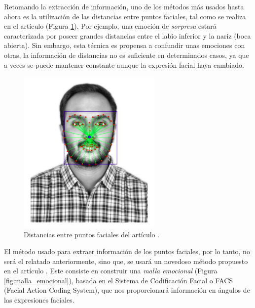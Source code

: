 Retomando la extracción de información, uno de los métodos más usados hasta ahora es la utilización de las distancias entre puntos faciales, tal como se realiza en el artículo \cite{dlib_emotions} (Figura \ref{fig:dlib_foto_articulo}). Por ejemplo, una emoción de \textit{sorpresa} estará caracterizada por poseer grandes distancias entre el labio inferior y la nariz (boca abierta). Sin embargo, esta técnica es propensa a confundir unas emociones con otras, la información de distancias no es suficiente en determinados casos, ya que a veces se puede mantener constante aunque la expresión facial haya cambiado.

\begin{figure} [h!]
  \begin{center}
    \includegraphics[width=7cm]{figs/dlib_foto_articulo.png}
  \end{center}
  \captionsetup{justification=centering}
  \caption{Distancias entre puntos faciales del artículo \cite{dlib_emotions}.}
  \label{fig:dlib_foto_articulo}
\end{figure}

El método usado para extraer información de los puntos faciales, por lo tanto, no será el relatado anteriormente, sino que, se usará un novedoso método propuesto en el artículo \cite{mediapipe_emotions}. Este consiste en construir una \textit{malla emocional} (Figura \ref{fig:malla_emocional}), basada en el Sistema de Codificación Facial o FACS (Facial Action Coding System)\cite{Ekman1978FacialAC}\cite{Ekman1978FacialACManual}, que nos proporcionará información en ángulos de las expresiones faciales.

